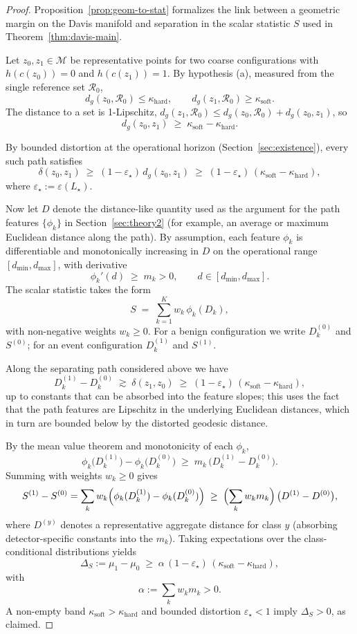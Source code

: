 \documentclass[11pt]{article}
\theoremstyle{remark}
\theoremstyle{plain}
\begin{document}
\begin{proof}
Proposition~\ref{prop:geom-to-stat} formalizes the link between a geometric margin on the Davis
manifold and separation in the scalar statistic $S$ used in Theorem~\ref{thm:davis-main}.

Let $z_0,z_1\in\mathcal{M}$ be representative points for two coarse configurations with
$h(c(z_0))=0$ and $h(c(z_1))=1$.  By hypothesis (a), measured from the single reference set $\mathcal{R}_0$,
\[
d_g(z_0,\mathcal{R}_0) \le \kappa_{\mathrm{hard}},
\qquad
d_g(z_1,\mathcal{R}_0) \ge \kappa_{\mathrm{soft}}.
\]
The distance to a set is 1-Lipschitz, $d_g(z_1,\mathcal{R}_0) \le d_g(z_0,\mathcal{R}_0) + d_g(z_0,z_1)$, so
\[
d_g(z_0,z_1) \;\ge\; \kappa_{\mathrm{soft}}-\kappa_{\mathrm{hard}}.
\]

By bounded distortion at the operational horizon (Section~\ref{sec:existence}), every such path
satisfies
\[
\delta(z_0,z_1)
\;\ge\;
(1-\varepsilon_\star)\,d_g(z_0,z_1)
\;\ge\;
(1-\varepsilon_\star)\,(\kappa_{\mathrm{soft}}-\kappa_{\mathrm{hard}}),
\]
where $\varepsilon_\star := \varepsilon(L_\star)$.

Now let $D$ denote the distance-like quantity used as the argument for the path features
$\{\phi_k\}$ in Section~\ref{sec:theory2} (for example, an average or maximum Euclidean distance
along the path).  By assumption, each feature $\phi_k$ is differentiable and monotonically
increasing in $D$ on the operational range $[d_{\min},d_{\max}]$, with derivative
\[
\phi_k'(d) \;\ge\; m_k > 0,\qquad d\in[d_{\min},d_{\max}].
\]
The scalar statistic takes the form
\[
S \;=\; \sum_{k=1}^K w_k\,\phi_k(D_k),
\]
with non-negative weights $w_k\ge 0$.  For a benign configuration we write $D_k^{(0)}$ and $S^{(0)}$;
for an event configuration $D_k^{(1)}$ and $S^{(1)}$.

Along the separating path considered above we have
\[
D_k^{(1)} - D_k^{(0)}
\;\gtrsim\;
\delta(z_1,z_0)
\;\ge\;
(1-\varepsilon_\star)\,(\kappa_{\mathrm{soft}}-\kappa_{\mathrm{hard}}),
\]
up to constants that can be absorbed into the feature slopes; this uses the fact that the path
features are Lipschitz in the underlying Euclidean distances, which in turn are bounded below
by the distorted geodesic distance.

By the mean value theorem and monotonicity of each $\phi_k$,
\[
\phi_k\bigl(D_k^{(1)}\bigr) - \phi_k\bigl(D_k^{(0)}\bigr)
\;\ge\;
m_k\,\bigl(D_k^{(1)} - D_k^{(0)}\bigr).
\]
Summing with weights $w_k\ge 0$ gives
\[
S^{(1)} - S^{(0)}
=
\sum_{k} w_k \Bigl(
\phi_k(D_k^{(1)}) - \phi_k(D_k^{(0)})
\Bigr)
\;\ge\;
\Bigl(\sum_k w_k m_k\Bigr)\,
\bigl(D^{(1)} - D^{(0)}\bigr),
\]
where $D^{(y)}$ denotes a representative aggregate distance for class $y$ (absorbing detector-specific
constants into the $m_k$).  Taking expectations over the class-conditional distributions yields
\[
\Delta_S := \mu_1 - \mu_0
\;\ge\;
\alpha\,(1-\varepsilon_\star)\,(\kappa_{\mathrm{soft}}-\kappa_{\mathrm{hard}}),
\]
with
\[
\alpha := \sum_{k} w_k m_k > 0.
\]
A non-empty band $\kappa_{\mathrm{soft}}>\kappa_{\mathrm{hard}}$ and bounded distortion
$\varepsilon_\star<1$ imply $\Delta_S>0$, as claimed.
\end{proof}
\end{document}
